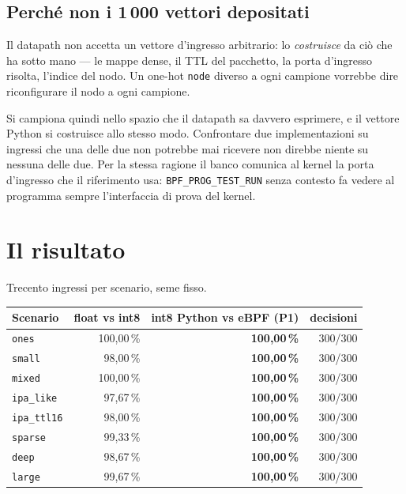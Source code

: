 \documentclass[11pt,a4paper,oneside]{report}
\begin{document}
\subsection*{Perché non i 1\,000 vettori depositati}

Il datapath non accetta un vettore d'ingresso arbitrario: lo \emph{costruisce}
da ciò che ha sotto mano --- le mappe dense, il TTL del pacchetto, la porta
d'ingresso risolta, l'indice del nodo. Un one-hot \texttt{node} diverso a ogni
campione vorrebbe dire riconfigurare il nodo a ogni campione.

Si campiona quindi nello spazio che il datapath sa davvero esprimere, e il
vettore Python si costruisce allo stesso modo. Confrontare due implementazioni
su ingressi che una delle due non potrebbe mai ricevere non direbbe niente su
nessuna delle due. Per la stessa ragione il banco comunica al kernel la porta
d'ingresso che il riferimento usa: \texttt{BPF\_PROG\_TEST\_RUN} senza contesto
fa vedere al programma sempre l'interfaccia di prova del kernel.

\section{Il risultato}

Trecento ingressi per scenario, seme fisso.

\begin{center}
\small
\begin{tabular}{@{}lrrr@{}}
\toprule
\textbf{Scenario} & \textbf{float vs int8} &
\textbf{int8 Python vs eBPF (P1)} & \textbf{decisioni} \\
\midrule
\texttt{ones}      & 100,00\,\% & \textbf{100,00\,\%} & 300/300 \\
\texttt{small}     &  98,00\,\% & \textbf{100,00\,\%} & 300/300 \\
\texttt{mixed}     & 100,00\,\% & \textbf{100,00\,\%} & 300/300 \\
\texttt{ipa\_like} &  97,67\,\% & \textbf{100,00\,\%} & 300/300 \\
\texttt{ipa\_ttl16}&  98,00\,\% & \textbf{100,00\,\%} & 300/300 \\
\texttt{sparse}    &  99,33\,\% & \textbf{100,00\,\%} & 300/300 \\
\texttt{deep}      &  98,67\,\% & \textbf{100,00\,\%} & 300/300 \\
\texttt{large}     &  99,67\,\% & \textbf{100,00\,\%} & 300/300 \\
\bottomrule
\end{tabular}
\end{center}
\end{document}
